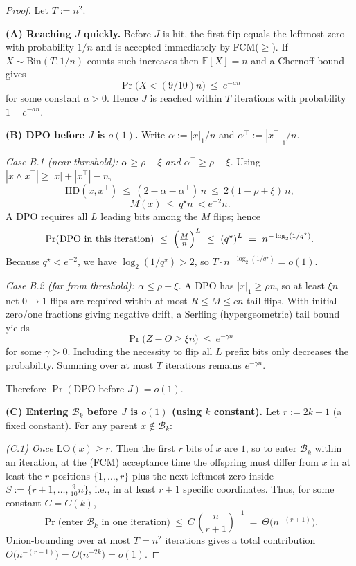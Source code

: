 \begin{proof}
	Let $T:=n^2$.
	
	\medskip\noindent
	\textbf{(A) Reaching $J$ quickly.}
	Before $J$ is hit, the first flip equals the leftmost zero with probability $1/n$ and is accepted
	immediately by FCM($\ge$).  If $X\sim\mathrm{Bin}(T,1/n)$ counts such increases then
	$\mathbb{E}[X]=n$ and a Chernoff bound gives
	\[
	\Pr\bigl(X<(9/10)n\bigr)\ \le\ e^{-a n}
	\]
	for some constant $a>0$. Hence $J$ is reached within $T$ iterations with probability $1-e^{-a n}$.
	
	\medskip\noindent
	\textbf{(B) DPO before $J$ is $o(1)$.}
	Write $\alpha:=|x|_1/n$ and $\alpha^\top:=|x^\top|_1/n$.
	
	\emph{Case B.1 (near threshold): $\alpha\ge \rho-\xi$ and $\alpha^\top\ge \rho-\xi$.}
	Using $|x\wedge x^\top|\ge |x|+|x^\top|-n$,
	\[
	\mathrm{HD}(x,x^\top)\ \le\ (2-\alpha-\alpha^\top)\,n\ \le\ 2(1-\rho+\xi)\,n,
	\]
	\[
	M(x)\ \le\ q^\star n\ <e^{-2}n
	.
	\]
	A DPO requires all $L$ leading bits among the $M$ flips; hence
	\[
	\Pr(\text{DPO in this iteration})
	\ \le\
	\Bigl(\tfrac{M}{n}\Bigr)^{L}
	\ \le\
	(q^\star)^{L}
	\ =\
	n^{-\log_{2}(1/q^\star)}.
	\]
	Because $q^\star<e^{-2}$, we have $\log_{2}(1/q^\star)>2$, so $T\cdot n^{-\log_{2}(1/q^\star)}=o(1)$.
	
	\emph{Case B.2 (far from threshold): $\alpha\le \rho-\xi$.}
	A DPO has $|x|_1\ge \rho n$, so at least $\xi n$ net $0\!\to\!1$ flips are required within at most
	$R\le M\le cn$ tail flips. With initial zero/one fractions giving negative drift,
	a Serfling (hypergeometric) tail bound yields
	\[
	\Pr\bigl(Z-O\ge \xi n\bigr)\ \le\ e^{-\gamma n}
	\]
	for some $\gamma>0$. Including the necessity to flip all $L$ prefix bits only decreases the probability.
	Summing over at most $T$ iterations remains $e^{-\gamma n}$.
	
	Therefore $\Pr(\text{DPO before }J)=o(1)$.
	
	\medskip\noindent
	\textbf{(C) Entering $\mathcal{B}_k$ before $J$ is $o(1)$ (using $k$ constant).}
	Let $r:=2k{+}1$ (a fixed constant).  For any parent $x\notin\mathcal{B}_k$:
	
	\emph{(C.1) Once $\mathrm{LO}(x)\ge r$.}
	Then the first $r$ bits of $x$ are $1$, so to enter $\mathcal{B}_k$ within an iteration, at the (FCM) acceptance time the offspring must differ from $x$ in at least the $r$ positions $\{1,\dots,r\}$ plus the next leftmost zero inside $S:=\{r{+}1,\dots,\tfrac{9}{10}n\}$, i.e., in at least $r{+}1$ specific coordinates. Thus, for some constant $C=C(k)$,
	\[
	\Pr\bigl(\text{enter } \mathcal{B}_k \text{ in one iteration}\bigr)
	\ \le\
	C\,\binom{n}{r+1}^{-1}
	\ =\
	\Theta\!\big(n^{-(r+1)}\big).
	\]
	Union-bounding over at most $T=n^2$ iterations gives a total contribution
	$O\!\big(n^{-(r-1)}\big)=O\!\big(n^{-2k}\big)=o(1)$.
	

\end{proof}

